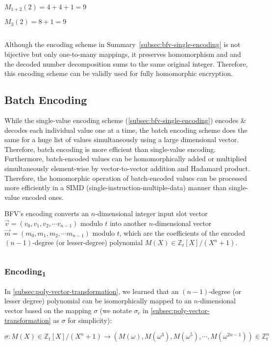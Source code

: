 $M_{1+2}(2) = 4 + 4 + 1 = 9$

$M_{3}(2) = 8 + 1 = 9$

$ $

Although the encoding scheme in Summary~\ref*{subsec:bfv-single-encoding} is not bijective but only one-to-many mappings, it preserves homomorphism and and the decoded number decomposition sums to the same original integer. Therefore, this encoding scheme can be validly used for fully homomorphic encryption.


\subsection{Batch Encoding}
\label{subsec:bfv-batch-encoding}

While the single-value encoding scheme (\autoref{subsec:bfv-single-encoding}) encodes \& decodes each individual value one at a time, the batch encoding scheme does the same for a huge list of values simultaneously using a large dimensional vector. Therefore, batch encoding is more efficient than single-value encoding. Furthermore, batch-encoded values can be homomorphically added or multiplied simultaneously element-wise by vector-to-vector addition and Hadamard product. Therefore, the homomorphic operation of batch-encoded values can be processed more efficiently in a SIMD (single-instruction-multiple-data) manner than single-value encoded ones. 

BFV's encoding converts an $n$-dimensional integer input slot vector $\vec{v} = (v_0, v_1, v_2, \cdots v_{n-1})$ modulo $t$ into another $n$-dimensional vector $\vec{m} = (m_0, m_1, m_2, \cdots m_{n-1})$ modulo $t$, which are the coefficients of the encoded $(n-1)$-degree (or lesser-degree) polynomial $M(X) \in \mathbb{Z}_t[X] / (X^n + 1)$. 

$ $

\subsubsection{\textsf{Encoding\textsubscript{1}}}  
\label{subsubsec:bfv-encoding-1} 

In \autoref{subsec:poly-vector-transformation}, we learned that an $(n-1)$-degree (or lesser degree) polynomial can be isomorphically mapped to an $n$-dimensional vector based on the mapping $\sigma$ (we notate $\sigma_c$ in \autoref{subsec:poly-vector-transformation} as $\sigma$ for simplicity): 

$\sigma: M(X) \in \mathbb{Z}_t[X]/(X^n + 1) \longrightarrow  (M(\omega),M(\omega^3),M(\omega^5), \cdots, M(\omega^{2n-1})) \in \mathbb{Z}_t^n$

